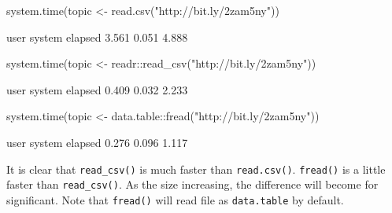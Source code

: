 \documentclass[
  12pt,
]{krantz}
\makeatletter
\newenvironment{Shaded}{\begin{snugshade}}{\end{snugshade}}
\newcommand{\FunctionTok}[1]{\textcolor[rgb]{0,0,0}{#1}}
\newcommand{\NormalTok}[1]{#1}
\newcommand{\OtherTok}[1]{\textcolor[rgb]{0.37,0.37,0.37}{#1}}
\newcommand{\SpecialCharTok}[1]{\textcolor[rgb]{0,0,0}{#1}}
\newcommand{\StringTok}[1]{\textcolor[rgb]{0.5,0.5,0.5}{#1}}
\newenvironment{kframe}{%
\medskip{}
\setlength{\fboxsep}{.8em}
 \def\at@end@of@kframe{}%
 \ifinner\ifhmode%
  \def\at@end@of@kframe{\end{minipage}}%
  \begin{minipage}{\columnwidth}%
 \fi\fi%
 \def\FrameCommand##1{\hskip\@totalleftmargin \hskip-\fboxsep
 \colorbox{shadecolor}{##1}\hskip-\fboxsep
     \hskip-\linewidth \hskip-\@totalleftmargin \hskip\columnwidth}%
 \MakeFramed {\advance\hsize-\width
   \@totalleftmargin\z@ \linewidth\hsize
   \@setminipage}}%
 {\par\unskip\endMakeFramed%
 \at@end@of@kframe}
\renewenvironment{Shaded}{\begin{kframe}}{\end{kframe}}
\makeatother
\begin{document}
\begin{Shaded}
\begin{Highlighting}[]
\FunctionTok{system.time}\NormalTok{(topic }\OtherTok{\textless{}{-}} \FunctionTok{read.csv}\NormalTok{(}\StringTok{"http://bit.ly/2zam5ny"}\NormalTok{))}
\end{Highlighting}
\end{Shaded}

\begin{Shaded}
\begin{Highlighting}[]
\NormalTok{   user  system elapsed }
\NormalTok{  3.561   0.051   4.888 }
\end{Highlighting}
\end{Shaded}

\begin{Shaded}
\begin{Highlighting}[]
\FunctionTok{system.time}\NormalTok{(topic }\OtherTok{\textless{}{-}}\NormalTok{ readr}\SpecialCharTok{::}\FunctionTok{read\_csv}\NormalTok{(}\StringTok{"http://bit.ly/2zam5ny"}\NormalTok{))}
\end{Highlighting}
\end{Shaded}

\begin{Shaded}
\begin{Highlighting}[]
\NormalTok{   user  system elapsed }
\NormalTok{  0.409   0.032   2.233 }
\end{Highlighting}
\end{Shaded}

\begin{Shaded}
\begin{Highlighting}[]
\FunctionTok{system.time}\NormalTok{(topic }\OtherTok{\textless{}{-}}\NormalTok{ data.table}\SpecialCharTok{::}\FunctionTok{fread}\NormalTok{(}\StringTok{"http://bit.ly/2zam5ny"}\NormalTok{))}
\end{Highlighting}
\end{Shaded}

\begin{Shaded}
\begin{Highlighting}[]
\NormalTok{   user  system elapsed }
\NormalTok{  0.276   0.096   1.117 }
\end{Highlighting}
\end{Shaded}

It is clear that \texttt{read\_csv()} is much faster than \texttt{read.csv()}. \texttt{fread()} is a little faster than \texttt{read\_csv()}. As the size increasing, the difference will become for significant. Note that \texttt{fread()} will read file as \texttt{data.table} by default.
\end{document}
